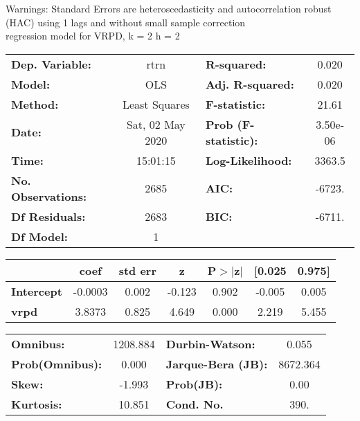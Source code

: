 Warnings: \newline
 [1] Standard Errors are heteroscedasticity and autocorrelation robust (HAC) using 1 lags and without small sample correction\\ 

regression model for VRPD, k = 2 h = 2\begin{center}
\begin{tabular}{lclc}
\toprule
\textbf{Dep. Variable:}    &       rtrn       & \textbf{  R-squared:         } &     0.020   \\
\textbf{Model:}            &       OLS        & \textbf{  Adj. R-squared:    } &     0.020   \\
\textbf{Method:}           &  Least Squares   & \textbf{  F-statistic:       } &     21.61   \\
\textbf{Date:}             & Sat, 02 May 2020 & \textbf{  Prob (F-statistic):} &  3.50e-06   \\
\textbf{Time:}             &     15:01:15     & \textbf{  Log-Likelihood:    } &    3363.5   \\
\textbf{No. Observations:} &        2685      & \textbf{  AIC:               } &    -6723.   \\
\textbf{Df Residuals:}     &        2683      & \textbf{  BIC:               } &    -6711.   \\
\textbf{Df Model:}         &           1      & \textbf{                     } &             \\
\bottomrule
\end{tabular}
\begin{tabular}{lcccccc}
                   & \textbf{coef} & \textbf{std err} & \textbf{z} & \textbf{P$> |$z$|$} & \textbf{[0.025} & \textbf{0.975]}  \\
\midrule
\textbf{Intercept} &      -0.0003  &        0.002     &    -0.123  &         0.902        &       -0.005    &        0.005     \\
\textbf{vrpd}      &       3.8373  &        0.825     &     4.649  &         0.000        &        2.219    &        5.455     \\
\bottomrule
\end{tabular}
\begin{tabular}{lclc}
\textbf{Omnibus:}       & 1208.884 & \textbf{  Durbin-Watson:     } &    0.055  \\
\textbf{Prob(Omnibus):} &   0.000  & \textbf{  Jarque-Bera (JB):  } & 8672.364  \\
\textbf{Skew:}          &  -1.993  & \textbf{  Prob(JB):          } &     0.00  \\
\textbf{Kurtosis:}      &  10.851  & \textbf{  Cond. No.          } &     390.  \\
\bottomrule
\end{tabular}
\end{center}

